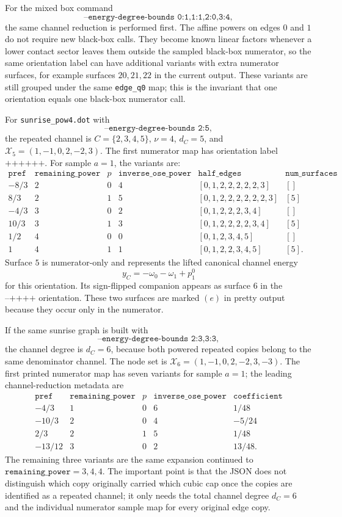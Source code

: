 \documentclass[11pt,a4paper]{report}
\newcommand{\Samples}{\mathcal X}
\begin{document}
For the mixed box command
\[
  \texttt{--energy-degree-bounds 0:1,1:1,2:0,3:4},
\]
the same channel reduction is performed first.  The affine powers on edges
\(0\) and \(1\) do not require new black-box calls.  They become known linear
factors whenever a lower contact sector leaves them outside the sampled
black-box numerator, so the same orientation label can have additional
variants with extra numerator surfaces, for example surfaces \(20,21,22\) in
the current output.  These variants are still grouped under the same
\texttt{edge\_q0} map; this is the invariant that one orientation equals one
black-box numerator call.

For \texttt{sunrise\_pow4.dot} with
\[
  \texttt{--energy-degree-bounds 2:5},
\]
the repeated channel is \(C=\{2,3,4,5\}\), \(\nu=4\), \(d_C=5\), and
\(\Samples_5=(1,-1,0,2,-2,3)\).  The first numerator map has orientation label
\(\texttt{++++++}\).  For sample \(a=1\), the variants are:
\[
\begin{array}{c|c|c|c|c|c}
\texttt{pref} & \texttt{remaining\_power} & p &
\texttt{inverse\_ose\_power} & \texttt{half\_edges} &
\texttt{num\_surfaces}\\
\hline
-8/3 & 2 & 0 & 4 & [0,1,2,2,2,2,2,3] & []\\
 8/3 & 2 & 1 & 5 & [0,1,2,2,2,2,2,2,3] & [5]\\
-4/3 & 3 & 0 & 2 & [0,1,2,2,2,3,4] & []\\
10/3 & 3 & 1 & 3 & [0,1,2,2,2,2,3,4] & [5]\\
 1/2 & 4 & 0 & 0 & [0,1,2,3,4,5] & []\\
 1   & 4 & 1 & 1 & [0,1,2,2,3,4,5] & [5].
\end{array}
\]
Surface \(5\) is numerator-only and represents the lifted canonical channel
energy
\[
  y_C=-\omega_0-\omega_1+p_1^0
\]
for this orientation.  Its sign-flipped companion appears as surface \(6\) in
the \(\texttt{--++++}\) orientation.  These two surfaces are marked
\((e)\) in pretty output because they occur only in the numerator.

If the same sunrise graph is built with
\[
  \texttt{--energy-degree-bounds 2:3,3:3},
\]
the channel degree is \(d_C=6\), because both powered repeated copies belong
to the same denominator channel.  The node set is
\(\Samples_6=(1,-1,0,2,-2,3,-3)\).  The first printed numerator map has seven
variants for sample \(a=1\); the leading channel-reduction metadata are
\[
\begin{array}{c|c|c|c|c}
\texttt{pref} & \texttt{remaining\_power} & p &
\texttt{inverse\_ose\_power} & \texttt{coefficient}\\
\hline
-4/3  & 1 & 0 & 6 & 1/48\\
-10/3 & 2 & 0 & 4 & -5/24\\
 2/3  & 2 & 1 & 5 & 1/48\\
-13/12& 3 & 0 & 2 & 13/48 .
\end{array}
\]
The remaining three variants are the same expansion continued to
\(\texttt{remaining\_power}=3,4,4\).  The important point is that the JSON
does not distinguish which copy originally carried which cubic cap once the
copies are identified as a repeated channel; it only needs the total channel
degree \(d_C=6\) and the individual numerator sample map for every original
edge copy.
\end{document}
